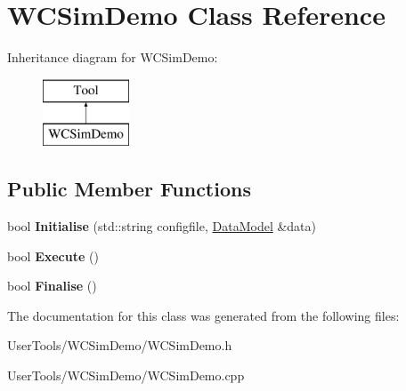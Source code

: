 \hypertarget{classWCSimDemo}{\section{W\-C\-Sim\-Demo Class Reference}
\label{classWCSimDemo}
}
Inheritance diagram for W\-C\-Sim\-Demo\-:\begin{figure}[H]
\begin{center}
\leavevmode
\includegraphics[height=2.000000cm]{classWCSimDemo}
\end{center}
\end{figure}
\subsection*{Public Member Functions}
\begin{DoxyCompactItemize}
\item 
\hypertarget{classWCSimDemo_a0ec2651affef77275da0f9745f2f2e17}{bool {\bfseries Initialise} (std\-::string configfile, \hyperlink{classDataModel}{Data\-Model} \&data)}\label{classWCSimDemo_a0ec2651affef77275da0f9745f2f2e17}

\item 
\hypertarget{classWCSimDemo_afbfeba6ecafbac87f0e02c91f2f268c0}{bool {\bfseries Execute} ()}\label{classWCSimDemo_afbfeba6ecafbac87f0e02c91f2f268c0}

\item 
\hypertarget{classWCSimDemo_ac2f3315863ec62ce94ecef11099b40af}{bool {\bfseries Finalise} ()}\label{classWCSimDemo_ac2f3315863ec62ce94ecef11099b40af}

\end{DoxyCompactItemize}


The documentation for this class was generated from the following files\-:\begin{DoxyCompactItemize}
\item 
User\-Tools/\-W\-C\-Sim\-Demo/W\-C\-Sim\-Demo.\-h\item 
User\-Tools/\-W\-C\-Sim\-Demo/W\-C\-Sim\-Demo.\-cpp\end{DoxyCompactItemize}
